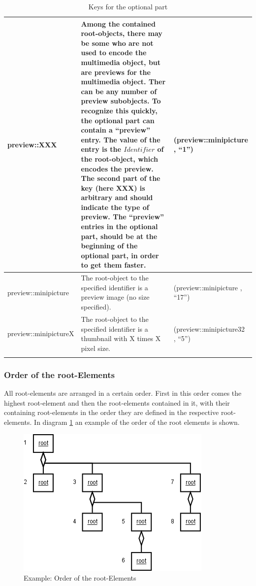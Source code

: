 \begin{small}
\begin{center}
\begin{longtable}{|p{23mm}|p{60mm}|p{40mm}|}
	preview::XXX & Among the contained root-objects, there may be some who are not used to encode the multimedia object, but are \textbf{previews} for the multimedia object. Ther can be any number of preview subobjects. To recognize this quickly, the optional part can contain a ``preview'' entry. The value of the entry is the $Identifier$ of the root-object, which encodes the preview. The second part of the key (here XXX) is arbitrary and should indicate the type of preview. The ``preview'' entries in the optional part, should be at the beginning of the optional part, in order to get them faster. & (preview::minipicture , ``1'')\\\hline
	preview::\-minipicture & The root-object to the specified identifier is a preview image (no size specified). & (preview::minipicture , ``17'')\\\hline
	preview::\-minipictureX & The root-object to the specified identifier is a thumbnail with X times X pixel size. & (preview::minipicture32 , ``5'')\\\hline

\caption{Keys for the optional part}
\label{TableKeysOptionalpart}
\end{longtable}
\end{center}
\end{small}


\subsubsection{Order of the root-Elements}
\label{secRootOrder}

All root-elements are arranged in a certain order. First in this order comes the highest root-element and then the root-elements contained in it, with their containing root-elements in the order they are defined in the respective root-elements. In diagram \ref{figOrderRoot} an example of the order of the root elements is shown.

\begin{figure}[htbp]
\begin{center}
  \includegraphics[scale=0.4]{order_root}
\end{center}
\caption{Example: Order of the root-Elements}
\label{figOrderRoot}
\end{figure}

